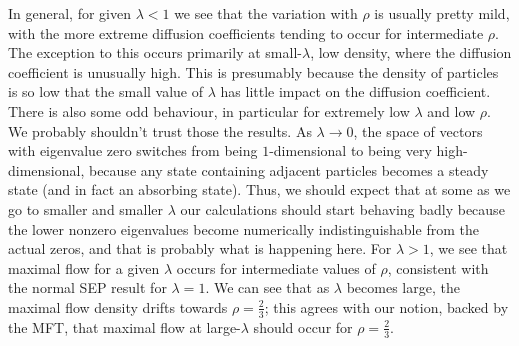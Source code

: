 In general, for given $\lambda<1$ we see that the variation with $\rho$ is usually pretty mild, with the more
extreme diffusion coefficients tending to occur for intermediate $\rho$. The exception to this occurs
primarily at small-$\lambda$, low density, where the diffusion 
coefficient is unusually high. This is presumably because the density
of particles is so low that the small value of $\lambda$ has little impact on the diffusion coefficient.
There is also some odd behaviour, in particular for extremely low $\lambda$ and low $\rho$. We probably
shouldn't trust those the results. As $\lambda \rightarrow 0$, the space of vectors with eigenvalue zero
switches from being $1$-dimensional to being very high-dimensional, because any state containing adjacent
particles becomes a steady state (and in fact an absorbing state). Thus, we should expect that at some
as we go to smaller and smaller $\lambda$ our calculations should start behaving badly because the lower
nonzero  eigenvalues become numerically indistinguishable from the actual zeros, and that is probably what
is happening here.
For $\lambda>1$, we see that maximal flow for a given $\lambda$ occurs for intermediate values of
$\rho$, consistent with the normal SEP result for $\lambda=1$. We can see that as $\lambda$
becomes large, the maximal flow density drifts towards $\rho=\frac{2}{3}$; this agrees with our
notion, backed by the MFT, that maximal flow at large-$\lambda$ should occur for
$\rho=\frac{2}{3}$.

